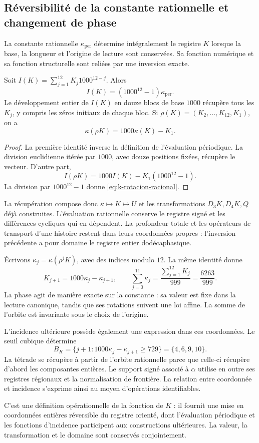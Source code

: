\subsection{Réversibilité de la constante rationnelle et changement de phase}

La constante rationnelle \(\kappa_{\mathrm{per}}\) détermine intégralement
le registre \(K\) lorsque la base, la longueur et l'origine
de lecture sont conservées. Sa fonction numérique et sa fonction structurelle sont reliées
par une inversion exacte.

\begin{proposition}
Soit \(I(K)=\sum_{j=1}^{12}K_j1000^{12-j}\). Alors
\[
 I(K)=(1000^{12}-1)\kappa_{\mathrm{per}}.
\]
Le développement entier de \(I(K)\) en douze blocs de base \(1000\)
récupère tous les \(K_j\), y compris les zéros initiaux de chaque bloc.
Si \(\rho(K)=(K_2,\ldots,K_{12},K_1)\), on a
\begin{equation}
 \kappa(\rho K)=1000\kappa(K)-K_1.
 \label{eq:k-rotacion-racional}
\end{equation}
\end{proposition}
\begin{proof}
La première identité inverse la définition de l'évaluation périodique.
La division euclidienne itérée par \(1000\), avec douze positions fixées,
récupère le vecteur. D'autre part,
\[
 I(\rho K)=1000I(K)-K_1(1000^{12}-1).
\]
La division par \(1000^{12}-1\) donne \eqref{eq:k-rotacion-racional}.
\end{proof}

La récupération compose donc \(\kappa\mapsto K\mapsto U\)
et les transformations \(D_3K,D_4K,Q\) déjà construites. L'évaluation
rationnelle conserve le registre signé et les différences cycliques qui
en dépendent. La profondeur totale et les opérateurs de transport d'une
histoire restent dans leurs coordonnées propres : l'inversion précédente
a pour domaine le registre entier dodécaphasique.

Écrivons \(\kappa_j=\kappa(\rho^jK)\), avec des indices modulo \(12\).
La même identité donne
\[
 K_{j+1}=1000\kappa_j-\kappa_{j+1},\qquad
 \sum_{j=0}^{11}\kappa_j=\frac{\sum_{j=1}^{12}K_j}{999}
 =\frac{6263}{999}.
\]
La phase agit de manière exacte sur la constante : sa valeur est fixe
dans la lecture canonique, tandis que ses rotations suivent une loi affine.
La somme de l'orbite est invariante sous le choix de l'origine.

L'incidence ultérieure possède également une expression dans ces
coordonnées. Le seuil cubique détermine
\[
 B_K=\{j+1:1000\kappa_j-\kappa_{j+1}\ge729\}
 =\{4,6,9,10\}.
\]
La tétrade se récupère à partir de l'orbite rationnelle parce que celle-ci
récupère d'abord les composantes entières. Le support signé associé
à \(\alpha\) utilise en outre ses registres régionaux et la normalisation
de frontière. La relation entre coordonnée et incidence s'exprime ainsi
au moyen d'opérations identifiables.

C'est une définition opérationnelle de la fonction de \(K\) : il fournit
une mise en coordonnées entières réversible du registre orienté, dont
l'évaluation périodique et les fonctions d'incidence participent aux
constructions ultérieures. La valeur, la transformation et le domaine
sont conservés conjointement.
